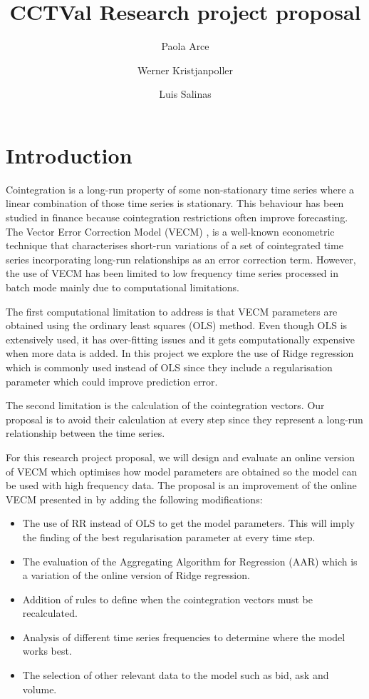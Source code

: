 \documentclass[12pt,reqno]{amsart}
\title[CCTVal Research project proposal]{CCTVal Research project proposal}
\author{Paola Arce}
\author{Werner Kristjanpoller}
\author{Luis Salinas}
\def\blue#1{{\color{blue} #1}}
\begin{document}
\maketitle%

\def\myitem#1{ \item[\blue{\bf #1}] }

\section{Introduction}
Cointegration is a long-run property of some non-stationary time series where a
linear combination of those time series is stationary.  This behaviour has been
studied in finance because cointegration restrictions often improve forecasting.
The Vector Error Correction Model (VECM)  \cite{engle1987}, is a well-known econometric technique
that characterises short-run variations of a set of cointegrated time series
incorporating long-run relationships as an error correction term. However, the use of VECM has been limited to low frequency time series processed in batch mode mainly due to computational limitations. 

The first computational limitation to address is that VECM parameters are obtained using the ordinary least squares (OLS)
method.  Even though OLS is extensively used, it has over-fitting
issues and it gets computationally expensive when more data is added. In this project we explore the use of Ridge regression which is commonly used
instead of OLS since they include a regularisation parameter which could improve
prediction error. 

The second limitation is the calculation of the cointegration vectors. Our proposal is to avoid their calculation at every step since they represent a long-run relationship between the time series.

For this research project proposal, we will design and evaluate an online version of VECM which optimises how model parameters are obtained so the model can be used with high frequency data. The proposal is an improvement of the online VECM presented in \cite{icpram15} by adding the following modifications:
\begin{itemize}
\item The use of RR instead of OLS to get the model parameters. This will imply the finding of the best regularisation parameter at every time step.
\item The evaluation of the Aggregating Algorithm for Regression (AAR) which is a variation of the online version of Ridge regression.
\item Addition of rules to define when the cointegration vectors must be recalculated.
\item Analysis of different time series frequencies to determine where the model works best.
\item The selection of other relevant data to the model such as bid, ask and volume.
\end{itemize}
\end{document}
